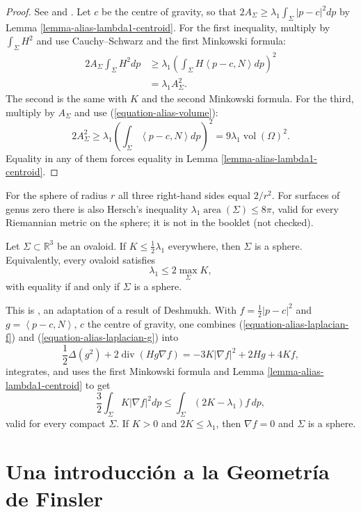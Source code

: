 \begin{proof}
See \cite[Theorem 5.5,
pp.~51--53]{alias2006analisis} and
\cite{reilly1977first}. Let $c$ be the
centre of gravity, so that
$2A_\Sigma\geq\lambda_1\int_\Sigma
|p-c|^2dp$ by Lemma
\ref{lemma-alias-lambda1-centroid}. For the
first inequality, multiply by
$\int_\Sigma H^2$ and use Cauchy--Schwarz
and the first Minkowski formula:
$$
\begin{aligned}
2A_\Sigma\int_\Sigma H^2dp
&\geq\lambda_1\left(\int_\Sigma
H\left\langle{} p-c,N\right\rangle{}dp
\right)^2\\
&=\lambda_1A_\Sigma^2.
\end{aligned}
$$
The second is the same with $K$ and the
second Minkowski formula. For the third,
multiply by $A_\Sigma$ and use
(\ref{equation-alias-volume}):
$$
2A_\Sigma^2\geq\lambda_1\left(
\int_\Sigma\left\langle{} p-c,N
\right\rangle{}dp\right)^2
=9\lambda_1\operatorname{vol}(\Omega)^2.
$$
Equality in any of them forces equality
in Lemma
\ref{lemma-alias-lambda1-centroid}.
\end{proof}

For the sphere of radius $r$ all three
right-hand sides equal $2/r^2$. For
surfaces of genus zero there is also
Hersch's inequality
$\lambda_1\operatorname{area}(\Sigma)
\leq 8\pi$, valid for every Riemannian
metric on the sphere; it is not in the
booklet (not checked).

\begin{theorem}
\label{theorem-alias-deshmukh}
Let $\Sigma\subset\mathbb{R}^3$ be an
ovaloid. If $K\leq\frac{1}{2}\lambda_1$
everywhere, then $\Sigma$ is a sphere.
Equivalently, every ovaloid satisfies
$$
\lambda_1\leq 2\max_\Sigma K,
$$
with equality if and only if $\Sigma$ is
a sphere.
\end{theorem}

This is \cite[Theorem 5.6,
pp.~53--55]{alias2006analisis}, an
adaptation of a result of Deshmukh. With
$f=\frac{1}{2}|p-c|^2$ and
$g=\left\langle{} p-c,N\right\rangle{}$,
$c$ the centre of gravity, one combines
(\ref{equation-alias-laplacian-f}) and
(\ref{equation-alias-laplacian-g}) into
$$
\frac{1}{2}\Delta(g^2)
+2\operatorname{div}(Hg\nabla f)
=-3K|\nabla f|^2+2Hg+4Kf,
$$
integrates, and uses the first Minkowski
formula and Lemma
\ref{lemma-alias-lambda1-centroid} to get
$$
\frac{3}{2}\int_\Sigma K|\nabla f|^2dp
\leq\int_\Sigma(2K-\lambda_1)f\,dp,
$$
valid for every compact $\Sigma$. If
$K>0$ and $2K\leq\lambda_1$, then
$\nabla f=0$ and $\Sigma$ is a sphere.

\section{Una introducción a la Geometría de
Finsler}
\label{section-javaloyes-finsler-geometry}

